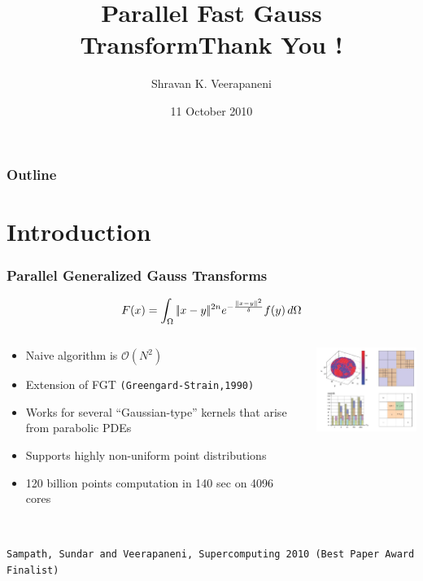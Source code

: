 \documentclass[red]{beamer}
\title{Parallel Fast Gauss Transform}
\author{Shravan K. Veerapaneni}
\institute{Courant Institute of Mathematical Sciences \\
            \vspace{.1in}
             \texttt{[image: nyulogo.jpg]} \vspace{0.5in}   \\$\quad$}
\date{11 October 2010}
\begin{document}
\begin{frame}
 \titlepage
\end{frame}

\begin{frame}
\frametitle{Outline}
\tableofcontents
\end{frame}

\section{Introduction}

\begin{frame}
\frametitle{Parallel Generalized Gauss Transforms }
\begin{block}{}
\[ 
F(x) = \int_\Omega |\!| x - y |\!|^{2n} e^{-\frac{|\!| x - y |\!|^2}{\delta}} f(y) \, d\Omega
 \] 
\end{block}

\begin{columns}
\begin{column}{.6\textwidth}
\begin{block}{}
\begin{itemize}
 \item Naive algorithm is $\mathcal{O}(N^2)$
 \item Extension of FGT {\tiny \texttt{(Greengard-Strain,1990)}}
 \item Works for several ``Gaussian-type'' kernels that arise from parabolic PDEs
 \item Supports highly non-uniform point distributions 
 \item 120 billion points computation in 140 sec on 4096 cores 
\end{itemize}
\end{block}
		\end{column}
		\begin{column}{.4\textwidth}
			\begin{center}\includegraphics[width = 1.7in]{pfgt.jpg} \end{center}
		\end{column}
	\end{columns}
$\quad$\\
\texttt{{\tiny Sampath, Sundar and Veerapaneni, Supercomputing 2010 (Best Paper Award Finalist)}}		
\end{frame}



\title{Thank You !}
\author{ }
\institute{ }
\date{ }
\begin{frame}
  \titlepage
\end{frame}
\end{document}
